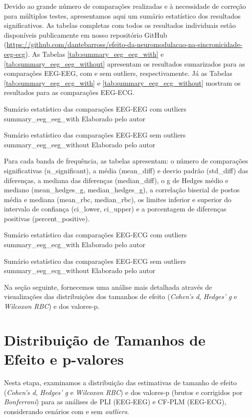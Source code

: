 Devido ao grande número de comparações realizadas e à necessidade de correção para múltiplos testes, apresentamos aqui um sumário estatístico dos resultados significativos. As tabelas completas com todos os resultados individuais estão disponíveis publicamente em nosso repositório GitHub \cite{barros2025repository} (\url{https://github.com/dantebarross/efeito-da-neuromodulacao-na-sincronicidade-eeg-ecg}). As Tabelas \ref{tab:summary_eeg_eeg_with} e \ref{tab:summary_eeg_eeg_without} apresentam os resultados sumarizados para as comparações EEG-EEG, com e sem outliers, respectivamente. Já as Tabelas \ref{tab:summary_eeg_ecg_with} e \ref{tab:summary_eeg_ecg_without} mostram os resultados para as comparações EEG-ECG.

{Sumário estatístico das comparações EEG-EEG com outliers}
{summary_eeg_eeg_with}
{Elaborado pelo autor}

{Sumário estatístico das comparações EEG-EEG sem outliers}
{summary_eeg_eeg_without}
{Elaborado pelo autor}

Para cada banda de frequência, as tabelas apresentam: o número de comparações significativas (n\_significant), a média (mean\_diff) e desvio padrão (std\_diff) das diferenças, a mediana das diferenças (median\_diff), o g de Hedges médio e mediano (mean\_hedges\_g, median\_hedges\_g), a correlação biserial de postos média e mediana (mean\_rbc, median\_rbc), os limites inferior e superior do intervalo de confiança (ci\_lower, ci\_upper) e a porcentagem de diferenças positivas (percent\_positive).

{Sumário estatístico das comparações EEG-ECG com outliers}
{summary_eeg_ecg_with}
{Elaborado pelo autor}

{Sumário estatístico das comparações EEG-ECG sem outliers}
{summary_eeg_ecg_without}
{Elaborado pelo autor}

Na seção seguinte, fornecemos uma análise mais detalhada através de visualizações das distribuições dos tamanhos de efeito (\textit{Cohen's d}, \textit{Hedges' g} e \textit{Wilcoxon RBC}) e dos valores-p.

\section{Distribuição de Tamanhos de Efeito e p-valores}
\label{sec:effect_size_distribution}
Nesta etapa, examinamos a distribuição das estimativas de tamanho de efeito (\textit{Cohen's d}, \textit{Hedges' g} e \textit{Wilcoxon RBC}) e dos valores-p (brutos e corrigidos por \textit{Bonferroni}) para as análises de PLI (EEG-EEG) e CF-PLM (EEG-ECG), considerando cenários com e sem \textit{outliers}. 


